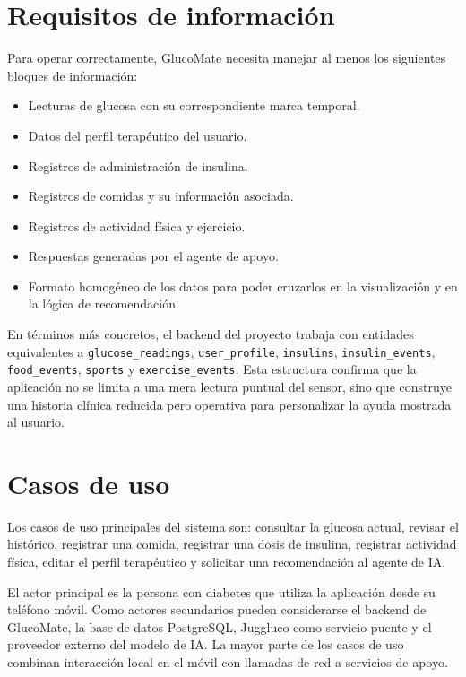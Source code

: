 \section{Requisitos de información}

Para operar correctamente, GlucoMate necesita manejar al menos los siguientes bloques de
información:

\begin{itemize}
    \item[\textbf{RI-01:}] Lecturas de glucosa con su correspondiente marca temporal.
    \item[\textbf{RI-02:}] Datos del perfil terapéutico del usuario.
    \item[\textbf{RI-03:}] Registros de administración de insulina.
    \item[\textbf{RI-04:}] Registros de comidas y su información asociada.
    \item[\textbf{RI-05:}] Registros de actividad física y ejercicio.
    \item[\textbf{RI-06:}] Respuestas generadas por el agente de apoyo.
    \item[\textbf{RI-07:}] Formato homogéneo de los datos para poder cruzarlos en la
          visualización y en la lógica de recomendación.
\end{itemize}

En términos más concretos, el backend del proyecto trabaja con entidades equivalentes a
\texttt{glucose\_readings}, \texttt{user\_profile}, \texttt{insulins},
\texttt{insulin\_events}, \texttt{food\_events}, \texttt{sports} y
\texttt{exercise\_events}. Esta estructura confirma que la aplicación no se limita a una
mera lectura puntual del sensor, sino que construye una historia clínica reducida pero
operativa para personalizar la ayuda mostrada al usuario.

\section{Casos de uso}

Los casos de uso principales del sistema son: consultar la glucosa actual, revisar el
histórico, registrar una comida, registrar una dosis de insulina, registrar actividad
física, editar el perfil terapéutico y solicitar una recomendación al agente de IA.

El actor principal es la persona con diabetes que utiliza la aplicación desde su teléfono
móvil. Como actores secundarios pueden considerarse el backend de GlucoMate, la base de
datos PostgreSQL, Juggluco como servicio puente y el proveedor externo del modelo de IA.
La mayor parte de los casos de uso combinan interacción local en el móvil con llamadas de
red a servicios de apoyo.

